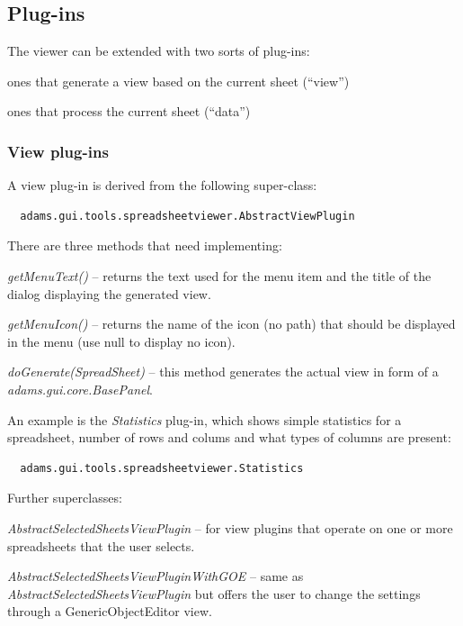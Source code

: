 \documentclass[a4paper]{book}
\begin{document}
\subsection{Plug-ins}
The viewer can be extended with two sorts of plug-ins:
\begin{tight_itemize}
	\item ones that generate a view based on the current sheet (``view'')
	\item ones that process the current sheet (``data'')
\end{tight_itemize}

\subsubsection{View plug-ins}
A view plug-in is derived from the following super-class:
\begin{verbatim}
  adams.gui.tools.spreadsheetviewer.AbstractViewPlugin
\end{verbatim}
There are three methods that need implementing:
\begin{tight_itemize}
	\item \textit{getMenuText()} -- returns the text used for the menu item 
	and the title of the dialog displaying the generated view.
	\item \textit{getMenuIcon()} -- returns the name of the icon (no path)
	that should be displayed in the menu (use null to display no icon). 
	\item \textit{doGenerate(SpreadSheet)} -- this method generates the
	actual view in form of a \textit{adams.gui.core.BasePanel}.
\end{tight_itemize}
An example is the \textit{Statistics} plug-in, which shows simple statistics
for a spreadsheet, number of rows and colums and what types of columns
are present:
\begin{verbatim}
  adams.gui.tools.spreadsheetviewer.Statistics
\end{verbatim}
Further superclasses:
\begin{tight_itemize}
	\item \textit{AbstractSelectedSheetsViewPlugin} -- for view plugins that
	operate on one or more spreadsheets that the user selects.
	\item \textit{AbstractSelectedSheetsViewPluginWithGOE} -- same as
	\textit{AbstractSelectedSheetsViewPlugin} but offers the user to change
	the settings through a GenericObjectEditor view.
\end{tight_itemize}
\end{document}
